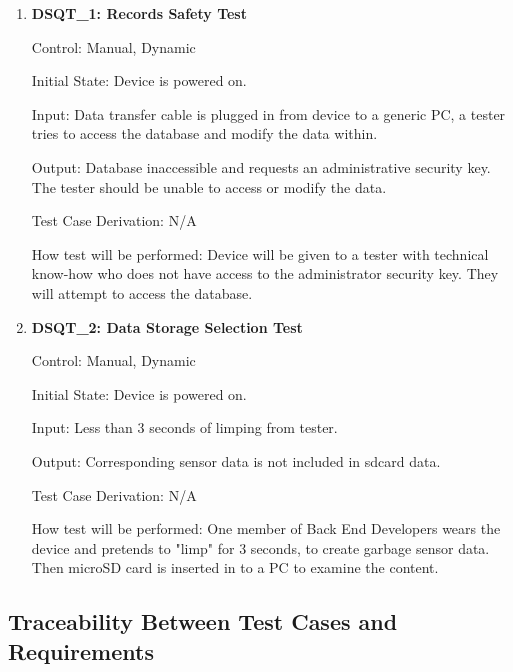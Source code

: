 \documentclass[12pt, titlepage]{article}
\begin{document}
\begin{enumerate}

\item{\textbf{DSQT\_1: Records Safety Test}}\label{DSQT1}

Control: Manual, Dynamic

Initial State: Device is powered on.

Input: Data transfer cable is plugged in from device to a generic PC, a tester tries to access the database and modify the data within.

Output: Database inaccessible and requests an administrative security key. The tester should be unable to access or modify the data.

Test Case Derivation: N/A

How test will be performed: Device will be given to a tester with technical know-how who does not have access to the administrator security key. They will attempt to access the database. 

\item{\textbf{DSQT\_2: Data Storage Selection Test}}\label{DSQT2}

Control: Manual, Dynamic

Initial State: Device is powered on.

Input: Less than 3 seconds of limping from tester.

Output: Corresponding sensor data is not included in sdcard data.

Test Case Derivation: N/A

How test will be performed: One member of Back End Developers wears the device and pretends to "limp" for 3 seconds, to create garbage sensor data. Then microSD card is inserted in to a PC to examine the content. 

\end{enumerate}



\subsection{Traceability Between Test Cases and Requirements}

\end{document}
